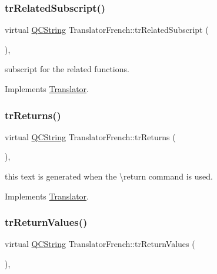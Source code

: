 \subsubsection{\texorpdfstring{trRelatedSubscript()}{trRelatedSubscript()}}
{\footnotesize\ttfamily virtual \mbox{\hyperlink{class_q_c_string}{Q\+C\+String}} Translator\+French\+::tr\+Related\+Subscript (\begin{DoxyParamCaption}{ }\end{DoxyParamCaption})\hspace{0.3cm}{\ttfamily [inline]}, {\ttfamily [virtual]}}

subscript for the related functions. 

Implements \mbox{\hyperlink{class_translator}{Translator}}.

\mbox{\label{class_translator_french_a56ef5bd431fa4d01d031ba1f4d220707}} 
\subsubsection{\texorpdfstring{trReturns()}{trReturns()}}
{\footnotesize\ttfamily virtual \mbox{\hyperlink{class_q_c_string}{Q\+C\+String}} Translator\+French\+::tr\+Returns (\begin{DoxyParamCaption}{ }\end{DoxyParamCaption})\hspace{0.3cm}{\ttfamily [inline]}, {\ttfamily [virtual]}}

this text is generated when the \textbackslash{}return command is used. 

Implements \mbox{\hyperlink{class_translator}{Translator}}.

\mbox{\label{class_translator_french_a867aaf2a7327e8dea597ae22e24d2ae0}} 
\subsubsection{\texorpdfstring{trReturnValues()}{trReturnValues()}}
{\footnotesize\ttfamily virtual \mbox{\hyperlink{class_q_c_string}{Q\+C\+String}} Translator\+French\+::tr\+Return\+Values (\begin{DoxyParamCaption}{ }\end{DoxyParamCaption})\hspace{0.3cm}{\ttfamily [inline]}, {\ttfamily [virtual]}}

